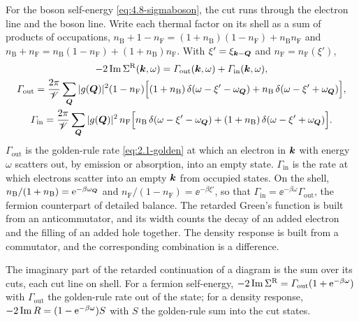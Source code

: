 For the boson self-energy \cref{eq:4.8-sigmaboson}, the cut runs through the electron line and the boson line. Write each thermal factor on its shell as a sum of products of occupations, $n_{\mathrm{B}} + 1 - n_{\mathrm{F}} = (1 + n_{\mathrm{B}})(1 - n_{\mathrm{F}}) + n_{\mathrm{B}}n_{\mathrm{F}}$ and $n_{\mathrm{B}} + n_{\mathrm{F}} = n_{\mathrm{B}}(1 - n_{\mathrm{F}}) + (1 + n_{\mathrm{B}})n_{\mathrm{F}}$. With $\xi' = \xi_{\bm{k}-\bm{Q}}$ and $n_{\mathrm{F}} = n_{\mathrm{F}}(\xi')$,
\begin{equation}
  \begin{gathered}
  -2\operatorname{Im}\Sigma^{\mathrm{R}}(\bm{k},\omega) = \varGamma_{\mathrm{out}}(\bm{k},\omega) + \varGamma_{\mathrm{in}}(\bm{k},\omega), \\
  \varGamma_{\mathrm{out}} = \frac{2\pi}{\mathscr{V}}\sum_{\bm{Q}}|g(\bm{Q})|^2(1 - n_{\mathrm{F}})\Bigl[(1 + n_{\mathrm{B}})\,\delta(\omega - \xi' - \omega_{\bm{Q}}) + n_{\mathrm{B}}\,\delta(\omega - \xi' + \omega_{\bm{Q}})\Bigr], \\
  \varGamma_{\mathrm{in}} = \frac{2\pi}{\mathscr{V}}\sum_{\bm{Q}}|g(\bm{Q})|^2\,n_{\mathrm{F}}\Bigl[n_{\mathrm{B}}\,\delta(\omega - \xi' - \omega_{\bm{Q}}) + (1 + n_{\mathrm{B}})\,\delta(\omega - \xi' + \omega_{\bm{Q}})\Bigr] .
  \end{gathered}
  \label{eq:4.8-cutsigma}
\end{equation}
$\varGamma_{\mathrm{out}}$ is the golden-rule rate \cref{eq:2.1-golden} at which an electron in $\bm{k}$ with energy $\omega$ scatters out, by emission or absorption, into an empty state. $\varGamma_{\mathrm{in}}$ is the rate at which electrons scatter into an empty $\bm{k}$ from occupied states. On the shell, $n_{\mathrm{B}}/(1 + n_{\mathrm{B}}) = \mathrm{e}^{-\beta\omega_{\bm{Q}}}$ and $n_{\mathrm{F}}/(1 - n_{\mathrm{F}}) = \ee^{-\beta\xi'}$, so that $\varGamma_{\mathrm{in}} = \ee^{-\beta\omega}\varGamma_{\mathrm{out}}$, the fermion counterpart of detailed balance. The retarded Green's function is built from an anticommutator, and its width counts the decay of an added electron and the filling of an added hole together. The density response is built from a commutator, and the corresponding combination is a difference.
\begin{keyresult}
The imaginary part of the retarded continuation of a diagram is the sum over its cuts, each cut line on shell. For a fermion self-energy, $-2\operatorname{Im}\Sigma^{\mathrm{R}} = \varGamma_{\mathrm{out}}(1 + \mathrm{e}^{-\beta\omega})$ with $\varGamma_{\mathrm{out}}$ the golden-rule rate out of the state; for a density response, $-2\operatorname{Im} R = (1 - \mathrm{e}^{-\beta\omega})S$ with $S$ the golden-rule sum into the cut states.
\end{keyresult}

